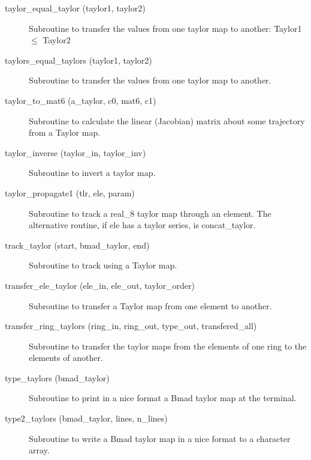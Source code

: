 \begin{description}
\item[taylor\_equal\_taylor (taylor1, taylor2)] \Newline
Subroutine to transfer the values from one taylor map to another: Taylor1 $\le$ Taylor2 

\item[taylors\_equal\_taylors (taylor1, taylor2)] \Newline 
Subroutine to transfer the values from one taylor map to another.

\item[taylor\_to\_mat6 (a\_taylor, c0, mat6, c1)] \Newline
Subroutine to calculate the linear (Jacobian) matrix about some trajectory from a Taylor map. 

\item[taylor\_inverse (taylor\_in, taylor\_inv)] \Newline
Subroutine to invert a taylor map. 

\item[taylor\_propagate1 (tlr, ele, param)] \Newline
Subroutine to track a real\_8 taylor map through an element. 
The alternative routine, if ele has a taylor series, is concat\_taylor. 

\item[track\_taylor (start, bmad\_taylor, end)] \Newline
Subroutine to track using a Taylor map. 

\item[transfer\_ele\_taylor (ele\_in, ele\_out, taylor\_order)] \Newline 
Subroutine to transfer a Taylor map from one element to another.

\item[transfer\_ring\_taylors (ring\_in, ring\_out, 
                                             type\_out, transfered\_all) ] \Newline 
Subroutine to transfer the taylor maps from the elements of one ring to
the elements of another. 

\item[type\_taylors (bmad\_taylor)] \Newline
Subroutine to print in a nice format a Bmad taylor map at the terminal. 

\item[type2\_taylors (bmad\_taylor, lines, n\_lines)] \Newline
Subroutine to write a Bmad taylor map in a nice format to a character array. 

\end{description}


